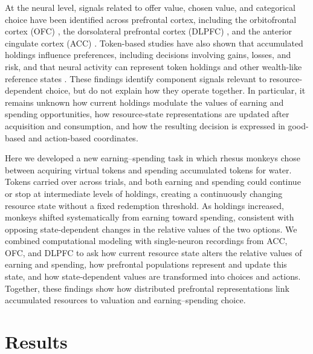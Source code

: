 \documentclass[pdflatex,sn-mathphys-num]{sn-jnl}%
\begin{document}
At the neural level, signals related to offer value, chosen value, and categorical choice have been identified across prefrontal cortex, including the orbitofrontal cortex (OFC) \cite{padoa-schioppaNeuronsOrbitofrontalCortex2006b,padoa-schioppaOrbitofrontalCortexNeural2017,ballestaValuesEncodedOrbitofrontal2020a}, the dorsolateral prefrontal cortex (DLPFC) \cite{cai2014contributions,lin2021evidence}, and the anterior cingulate cortex (ACC) \cite{caiNeuronalEncodingSubjective2012,kennerleyNeuronsFrontalLobe2009b}. Token-based studies have also shown that accumulated holdings influence preferences, including decisions involving gains, losses, and risk, and that neural activity can represent token holdings and other wealth-like reference states \cite{yangPrimateAnteriorInsular2022c,ferroAccumulationVirtualTokens2025a,nguyenNeuralRepresentationDecisional2025a,seo2009behavioral}. These findings identify component signals relevant to resource-dependent choice, but do not explain how they operate together. In particular, it remains unknown how current holdings modulate the values of earning and spending opportunities, how resource-state representations are updated after acquisition and consumption, and how the resulting decision is expressed in good-based and action-based coordinates.

Here we developed a new earning–spending task in which rhesus monkeys chose between acquiring virtual tokens and spending accumulated tokens for water. Tokens carried over across trials, and both earning and spending could continue or stop at intermediate levels of holdings, creating a continuously changing resource state without a fixed redemption threshold. As holdings increased, monkeys shifted systematically from earning toward spending, consistent with opposing state-dependent changes in the relative values of the two options. We combined computational modeling with single-neuron recordings from ACC, OFC, and DLPFC to ask how current resource state alters the relative values of earning and spending, how prefrontal populations represent and update this state, and how state-dependent values are transformed into choices and actions. Together, these findings show how distributed prefrontal representations link accumulated resources to valuation and earning–spending choice.

\section{Results}\label{sec2}
\end{document}
